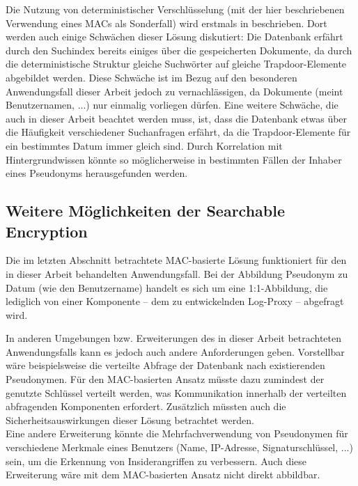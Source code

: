 Die Nutzung von deterministischer Verschlüsselung (mit der hier beschriebenen Verwendung eines MACs als Sonderfall) wird erstmals in \cite{bellare2007deterministic} beschrieben. Dort werden auch einige Schwächen dieser Lösung diskutiert: Die Datenbank erfährt durch den Suchindex bereits einiges über die gespeicherten Dokumente, da durch die deterministische Struktur gleiche Suchwörter auf gleiche Trapdoor-Elemente abgebildet werden. Diese Schwäche ist im Bezug auf den besonderen Anwendungsfall dieser Arbeit jedoch zu vernachlässigen, da Dokumente (meint Benutzernamen, ...) nur einmalig vorliegen dürfen. Eine weitere Schwäche, die auch in dieser Arbeit beachtet werden muss, ist, dass die Datenbank etwas über die Häufigkeit verschiedener Suchanfragen erfährt, da die Trapdoor-Elemente für ein bestimmtes Datum immer gleich sind. Durch Korrelation mit Hintergrundwissen könnte so möglicherweise in bestimmten Fällen der Inhaber eines Pseudonyms herausgefunden werden. 

\subsection{Weitere Möglichkeiten der Searchable Encryption}
\label{sec_state_se_furtherpossibilities}


Die im letzten Abschnitt betrachtete MAC-basierte Lösung funktioniert für den in dieser Arbeit behandelten Anwendungsfall. Bei der Abbildung Pseudonym zu Datum (wie den Benutzername) handelt es sich um eine 1:1-Abbildung, die lediglich von einer Komponente -- dem zu entwickelnden Log-Proxy -- abgefragt wird. 

In anderen Umgebungen bzw. Erweiterungen des in dieser Arbeit betrachteten Anwendungsfalls kann es jedoch auch andere Anforderungen geben. Vorstellbar wäre beispielsweise die verteilte Abfrage der Datenbank nach existierenden Pseudonymen. Für den MAC-basierten Ansatz müsste dazu zumindest der genutzte Schlüssel verteilt werden, was Kommunikation innerhalb der verteilten abfragenden Komponenten erfordert. Zusätzlich müssten auch die Sicherheitsauswirkungen dieser Lösung betrachtet werden.\\
Eine andere Erweiterung könnte die Mehrfachverwendung von Pseudonymen für verschiedene Merkmale eines Benutzers (Name, IP-Adresse, Signaturschlüssel, ...) sein, um die Erkennung von Insiderangriffen zu verbessern. Auch diese Erweiterung wäre mit dem MAC-basierten Ansatz nicht direkt abbildbar.

